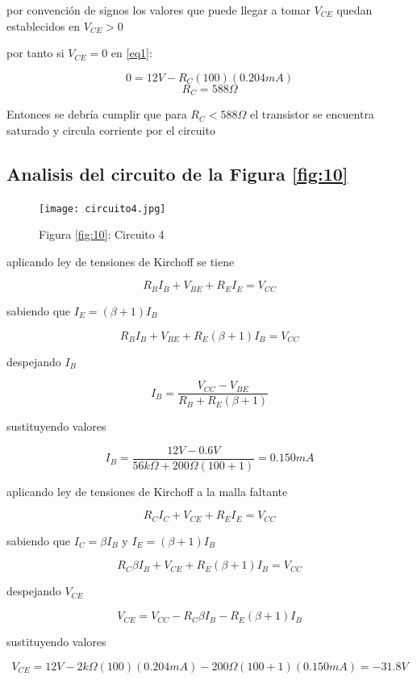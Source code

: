 \documentclass[10pt, a4paper]{article}
\begin{document}
    por convención de signos los valores que puede llegar a tomar $V_{CE}$ quedan establecidos  en $V_{CE} > 0$

    por tanto si $V_{CE} = 0$ en \ref{eq1}:

    $$0 = 12V - R_C (100) (0.204mA)$$
    $$R_C = 588\Omega$$

    Entonces se debría cumplir que para $R_C < 588\Omega$ el transistor se encuentra saturado y circula corriente por el circuito

    \subsection{Analisis del circuito de la Figura \ref{fig:10}}

    \begin{figure}[h!]
        \centering
        \texttt{[image: circuito4.jpg]} \par
        Figura \ref{fig:10}: Circuito 4 %
    \end{figure}

    aplicando ley de tensiones de Kirchoff se tiene

    $$R_BI_B + V_{BE} + R_EI_E= V_{CC}$$

    sabiendo que $I_E = (\beta+1)I_B$

    $$R_BI_B + V_{BE} + R_E(\beta+1)I_B= V_{CC}$$

    despejando $I_B$

    $$I_B = \frac{V_{CC} - V_{BE}}{R_B + R_E(\beta + 1)}$$

    sustituyendo valores

    $$I_B = \frac{12V - 0.6V}{56k\Omega + 200\Omega (100 + 1)} = 0.150mA$$

    aplicando ley de tensiones de Kirchoff a la malla faltante

    $$R_CI_C + V_{CE} + R_EI_E = V_{CC}$$

    sabiendo que $I_C = \beta I_B$ y $I_E = (\beta + 1)I_B$

    $$R_C\beta I_B + V_{CE} + R_E(\beta + 1)I_B= V_{CC}$$

    despejando $V_{CE}$

    \setcounter{equation}{1}
    \begin{equation}
        \label{eq2}
        V_{CE} = V_{CC} - R_C\beta I_B - R_E(\beta + 1)I_B
    \end{equation}

    sustituyendo valores

    $$V_{CE} = 12V - 2k\Omega (100) (0.204mA) - 200 \Omega (100 + 1)(0.150mA) = -31.8V$$
\end{document}
